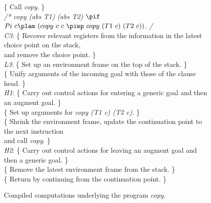\begin{figure}
\begin{tabbing}
\>            \>\{ \>Call {\it copy}.                                                                            \>\} \\
\> {\it /* copy (abs T1) (abs T2)} $\pif$ $Pi\ c\plam \ (copy\ c\ c\ \pimp \ copy\ (T1\ c)\ (T2\ c))$. {\it */} \\
\> {\it C3}:  \>\{ \>Recover relevant registers from the information in the latest choice point on the stack,        \\
\>            \>  \>and remove the choice point.                                                             \>\} \\
\> {\it L3}:  \>\{ \>Set up an environment frame on the top of the stack.                                    \>\} \\
\>            \>\{ \>Unify arguments of the incoming goal with those of the clause head.                     \>\} \\
\> {\it H1}:  \>\{ \>Carry out control actions for entering a generic goal and then an augment goal.         \>\} \\
\>            \>\{ \>Set up arguments for {\it copy (T1 c) (T2 c)}.                                          \>\} \\
\>            \>\{ \>Shrink the environment frame, update the continuation point to the next instruction          \\
\>            \>   \>and call {\it copy}.                                                                    \>\} \\
\> {\it H2}:  \>\{ \>Carry out control actions for leaving an augment goal and then a generic goal.          \>\} \\
\>            \>\{ \>Remove the latest environment frame from the stack.                                        \>\} \\
\>            \>\{ \>Return by continuing from the continuation point.                                       \>\}
\end{tabbing}
\caption{Compiled computations underlying the program {\it
copy}.}\label{fig:copy_proc_model}
\end{figure}


